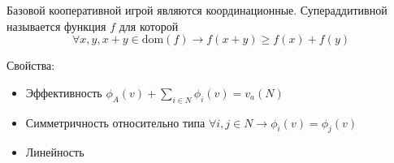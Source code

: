 Базовой кооперативной игрой являются координационные.
Супераддитивной называется функция $f$ для которой
\begin{equation}
    \forall x, y, x+y \in \text{dom}(f) \rightarrow f(x+y) \ge f(x) +f(y) 
\end{equation}


Свойства:
\begin{itemize}
    \item Эффективность $\phi_A(v) + \sum_{i \in N} \phi_i(v) = v_a(N)$
    \item Симметричность относительно типа $\forall i,j \in N \rightarrow \phi_i(v) = \phi_j(v)$
    \item Линейность 
\end{itemize}